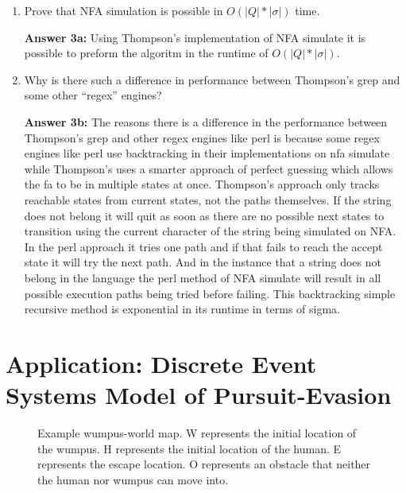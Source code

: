 \documentclass[12pt,letterpaper]{ntdhw}
\begin{document}
\begin{enumerate}
  \begin{enumerate}
    \item Prove that NFA simulation is possible in $O(|Q|*|\sigma|)$
      time.%
      \par \textbf{Answer 3a:} Using Thompson's implementation of NFA simulate it is possible to preform the algoritm in the runtime of $O(|Q|*|\sigma|)$. 

    \item Why is there such a difference in performance between
      Thompson's grep and some other ``regex'' engines?
      \par \textbf{Answer 3b:} The reasons there is a difference in the performance between Thompson's grep and other regex engines like perl is because some regex engines like perl use backtracking in their implementations on nfa simulate while Thompson's uses a smarter approach of perfect guessing which allows the fa to be in multiple states at once. Thompson's approach only tracks reachable states from current states, not the paths themselves. If the string does not belong it will quit as soon as there are no possible next states to transition using the current character of the string being simulated on NFA. In the perl approach it tries one path and if that fails to reach the accept state it will try the next path. And in the instance that a string does not belong in the language the perl method of NFA simulate will result in all possible execution paths being tried before failing. This backtracking simple recursive method is exponential in its runtime in terms of sigma. 
  \end{enumerate}




\end{enumerate}

\clearpage
\section*{Application: Discrete Event Systems Model of Pursuit-Evasion}

\begin{figure}[b]
  \centering
  \caption{Example wumpus-world map.  W represents the initial
    location of the wumpus.  H represents the initial location of the
    human.  E represents the escape location.  O represents an
    obstacle that neither the human nor wumpus can move into.}
  \label{fig:map}
\end{figure}
\end{document}
